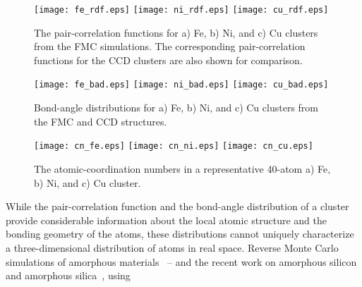 \documentclass[a4paper]{jpconf}
\begin{document}
\begin{figure}[ht]
\begin{center}
\texttt{[image: fe\_rdf.eps]}\hspace{2mm}
\texttt{[image: ni\_rdf.eps]}\hspace{2mm}
\texttt{[image: cu\_rdf.eps]}
\caption{\label{rdf} 
{\small 
The pair-correlation functions for a) Fe, b) Ni, and c) Cu clusters 
from the FMC simulations. The corresponding pair-correlation functions 
for the CCD clusters are also shown for comparison. 
}}
\end{center}
\end{figure}

\begin{figure}[ht]
\begin{center}
\texttt{[image: fe\_bad.eps]}\hspace{2mm}
\texttt{[image: ni\_bad.eps]}\hspace{2mm}
\texttt{[image: cu\_bad.eps]}
\caption{\label{bad}
{\small 
Bond-angle distributions for a) Fe, b) Ni, and c) Cu 
clusters from the FMC and CCD structures. 
}}
\end{center}
\end{figure}
%
\begin{figure}[ht]
\begin{center}
\texttt{[image: cn\_fe.eps]}\hspace{2mm}
\texttt{[image: cn\_ni.eps]}\hspace{2mm}
\texttt{[image: cn\_cu.eps]}
\caption{\label{CN}
{\small The atomic-coordination numbers in a representative 40-atom a) Fe, b) Ni, and c) Cu cluster. 
}}
\end{center}
\end{figure}
%
While the pair-correlation function and the bond-angle distribution 
of a cluster provide considerable information about the local atomic 
structure and the bonding geometry of the atoms, these distributions cannot 
uniquely characterize a three-dimensional distribution of atoms in real space. 
Reverse Monte Carlo simulations of amorphous 
materials~\cite{Biswas2004,RMC2001,Biswas2001} -- and the recent work on amorphous 
silicon and amorphous silica~\cite{Biswas2005,Pandey2015,Pandey2016a,Pandey2016b}, using 
\end{document}
